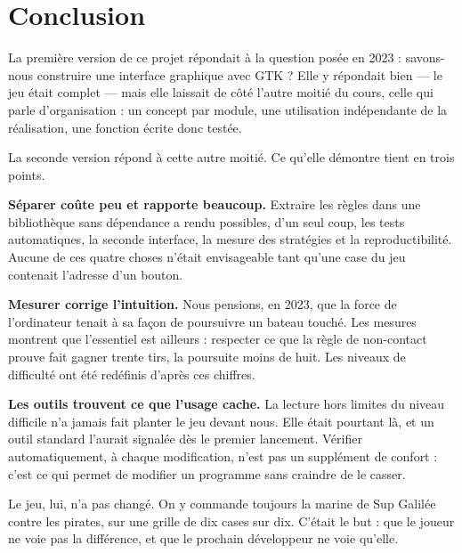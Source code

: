 \chapter{Conclusion}
\label{chap-conclusion}

La première version de ce projet répondait à la question posée en 2023 : savons-nous
construire une interface graphique avec GTK ? Elle y répondait bien --- le jeu était
complet --- mais elle laissait de côté l'autre moitié du cours, celle qui parle
d'organisation : un concept par module, une utilisation indépendante de la réalisation, une
fonction écrite donc testée.

La seconde version répond à cette autre moitié. Ce qu'elle démontre tient en trois points.

\textbf{Séparer coûte peu et rapporte beaucoup.} Extraire les règles dans une bibliothèque
sans dépendance a rendu possibles, d'un seul coup, les tests automatiques, la seconde
interface, la mesure des stratégies et la reproductibilité. Aucune de ces quatre choses
n'était envisageable tant qu'une case du jeu contenait l'adresse d'un bouton.

\textbf{Mesurer corrige l'intuition.} Nous pensions, en 2023, que la force de l'ordinateur
tenait à sa façon de poursuivre un bateau touché. Les mesures montrent que l'essentiel est
ailleurs : respecter ce que la règle de non-contact prouve fait gagner trente tirs, la
poursuite moins de huit. Les niveaux de difficulté ont été redéfinis d'après ces chiffres.

\textbf{Les outils trouvent ce que l'usage cache.} La lecture hors limites du niveau
difficile n'a jamais fait planter le jeu devant nous. Elle était pourtant là, et un outil
standard l'aurait signalée dès le premier lancement. Vérifier automatiquement, à chaque
modification, n'est pas un supplément de confort : c'est ce qui permet de modifier un
programme sans craindre de le casser.

Le jeu, lui, n'a pas changé. On y commande toujours la marine de Sup Galilée contre les
pirates, sur une grille de dix cases sur dix. C'était le but : que le joueur ne voie pas la
différence, et que le prochain développeur ne voie qu'elle.
